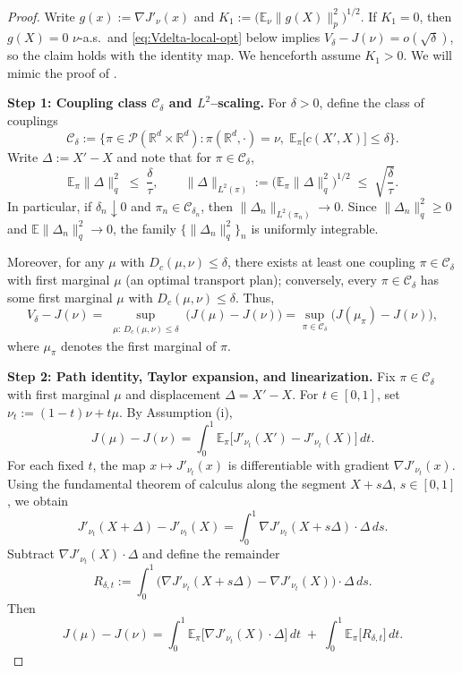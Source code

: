 \documentclass[11pt]{article}
\theoremstyle{definition}
\newcommand{\R}{\mathbb{R}}
\newcommand{\cP}{\mathcal{P}}
\newcommand{\E}{\mathbb{E}}
\begin{document}
\begin{proof}
Write $g(x) := \nabla J'_\nu(x)$ and 
$
  K_1 := \Big(\E_\nu\|g(X)\|_p^2\Big)^{1/2}.
$ 
If $K_1=0$, then $g(X)=0$ $\nu$-a.s.\ and \eqref{eq:Vdelta-local-opt} below implies
$V_\delta - J(\nu)=o(\sqrt{\delta})$, so the claim holds with the identity map.
We henceforth assume $K_1>0$. 
We will mimic the proof of \cite{BartlDrapeauOblojWiesel2021}.

\medskip
\noindent\textbf{Step 1: Coupling class $\mathcal{C}_\delta$ and $L^2$--scaling.}
For $\delta>0$, define the class of couplings
\[
  \mathcal{C}_\delta
  := \Big\{ \pi\in\cP(\R^d\times\R^d):
       \pi(\R^d,\cdot)=\nu,\;
       \E_\pi\big[c(X', X)\big]\le\delta
     \Big\}.
\]
Write $\Delta:=X'-X$ and note that for $\pi\in\mathcal{C}_\delta$,
\begin{equation}\label{eq:L2-budget}
  \E_\pi\|\Delta\|_q^2 \;\le\; \frac{\delta}{\tau},
  \qquad
  \|\Delta\|_{L^2(\pi)}
  := \big(\E_\pi\|\Delta\|_q^2\big)^{1/2}
  \;\le\; \sqrt{\frac{\delta}{\tau}}.
\end{equation}
In particular, if $\delta_n\downarrow 0$ and $\pi_n\in\mathcal{C}_{\delta_n}$, then
$\|\Delta_n\|_{L^2(\pi_n)}\to 0$. Since $\|\Delta_n\|_q^2\ge 0$ and
$\E\|\Delta_n\|_q^2\to 0$, the family $\{\|\Delta_n\|_q^2\}_n$ is uniformly integrable.

Moreover, for any $\mu$ with $D_c(\mu,\nu)\le\delta$,  there exists at least one coupling
$\pi\in\mathcal{C}_\delta$ with first marginal $\mu$ (an optimal transport plan);
conversely, every $\pi\in\mathcal{C}_\delta$
has some first marginal $\mu$ with $D_c(\mu,\nu)\le\delta$.
Thus, 
\[
  V_\delta - J(\nu)
  = \sup_{\substack{\mu:\,D_c(\mu,\nu)\le\delta}}
      \big(J(\mu)-J(\nu)\big)
  = \sup_{\pi\in\mathcal{C}_\delta}
      \big(J(\mu_\pi)-J(\nu)\big),
\]
where $\mu_\pi$ denotes the first marginal of $\pi$.

\medskip
\noindent\textbf{Step 2: Path identity, Taylor expansion, and linearization.}
Fix $\pi\in\mathcal{C}_\delta$ with first marginal $\mu$ and displacement $\Delta=X'-X$.
For $t\in[0,1]$, set $\nu_t := (1-t)\nu + t\mu$. By Assumption (i),
\begin{equation}\label{eq:path-identity}
  J(\mu)-J(\nu)
  = \int_0^1 \E_\pi\big[ J'_{\nu_t}(X') - J'_{\nu_t}(X) \big]\,dt.
\end{equation}
For each fixed $t$, the map $x\mapsto J'_{\nu_t}(x)$ is differentiable with gradient
$\nabla J'_{\nu_t}(x)$. Using the fundamental theorem of calculus along the segment
$X+s\Delta$, $s\in[0,1]$, we obtain
\[
  J'_{\nu_t}(X+\Delta) - J'_{\nu_t}(X)
  = \int_0^1 \nabla J'_{\nu_t}(X+s\Delta)\cdot\Delta\,ds.
\]
Subtract $\nabla J'_{\nu_t}(X)\cdot\Delta$ and define the remainder
\[
  R_{\delta,t}
  := \int_0^1 \big(\nabla J'_{\nu_t}(X+s\Delta)-\nabla J'_{\nu_t}(X)\big)\cdot\Delta\,ds.
\]
Then
\begin{equation}\label{eq:linearization-plus-R}
  J(\mu)-J(\nu)
  = \int_0^1 \E_\pi\big[\nabla J'_{\nu_t}(X)\cdot\Delta\big]\,dt
    \;+\; \int_0^1 \E_\pi\big[R_{\delta,t}\big]\,dt.
\end{equation}


\end{proof}
\end{document}
